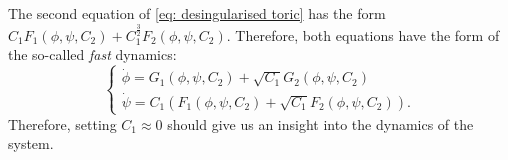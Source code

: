 \documentclass{article}
\theoremstyle{definition}
\numberwithin{equation}{section}
\begin{document}
The second equation of \eqref{eq: desingularised toric} has the form $C_1 F_1(\phi, \psi, C_2) + C_1^{\frac32}F_2(\phi,\psi, C_2)$. Therefore, both equations have the form of the so-called \textit{fast} dynamics:
\[
\begin{cases}
\dot{\phi} = G_1(\phi,\psi,C_2) + \sqrt{C_1}G_2(\phi,\psi,C_2)\\
\dot{\psi} = C_1\left(F_1(\phi,\psi,C_2) + \sqrt{C_1}F_2(\phi,\psi,C_2)\right).
\end{cases}
\]
Therefore, setting $C_1\approx 0$ should give us an insight into the dynamics of the system.\\
\begin{figure}
    \centering



\begin{tikzpicture}[x=0.75pt,y=0.75pt,yscale=-1,xscale=1]


\end{tikzpicture}
\end{figure}
\end{document}
